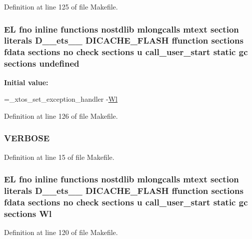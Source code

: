 Definition at line 125 of file Makefile.

\hypertarget{Makefile_a7caa220288c6621dffebfc3a50a851e1}{
\subsubsection[{undefined}]{\setlength{\rightskip}{0pt plus 5cm}E\-L fno inline functions nostdlib mlongcalls mtext section literals D\-\_\-\-\_\-ets\-\_\-\-\_\- D\-I\-C\-A\-C\-H\-E\-\_\-\-F\-L\-A\-S\-H ffunction sections fdata sections no check sections u call\-\_\-user\-\_\-start static gc sections undefined\hspace{0.3cm}{\ttfamily [static]}}}\label{Makefile_a7caa220288c6621dffebfc3a50a851e1}
{\bfseries Initial value\-:}
\begin{DoxyCode}
=\_xtos\_set\_exception\_handler 
    -\hyperlink{Makefile_a1af3a6ecef406b93f1a1db145b2cfd43}{Wl}
\end{DoxyCode}


Definition at line 126 of file Makefile.

\hypertarget{Makefile_a03169c2c7e2ff706233c78422b0daf3a}{
\subsubsection[{V\-E\-R\-B\-O\-S\-E}]{\setlength{\rightskip}{0pt plus 5cm}V\-E\-R\-B\-O\-S\-E}}\label{Makefile_a03169c2c7e2ff706233c78422b0daf3a}


Definition at line 15 of file Makefile.

\hypertarget{Makefile_a1af3a6ecef406b93f1a1db145b2cfd43}{
\subsubsection[{Wl}]{\setlength{\rightskip}{0pt plus 5cm}E\-L fno inline functions nostdlib mlongcalls mtext section literals D\-\_\-\-\_\-ets\-\_\-\-\_\- D\-I\-C\-A\-C\-H\-E\-\_\-\-F\-L\-A\-S\-H ffunction sections fdata sections no check sections u call\-\_\-user\-\_\-start static gc sections Wl}}\label{Makefile_a1af3a6ecef406b93f1a1db145b2cfd43}


Definition at line 120 of file Makefile.

